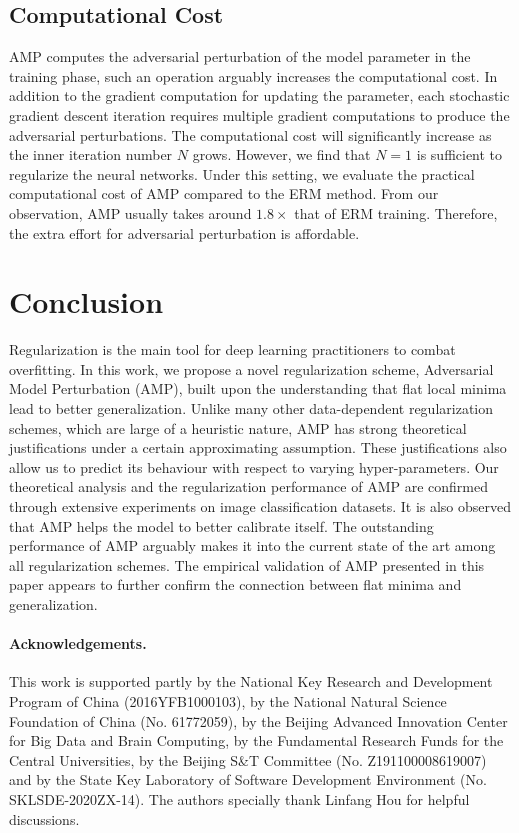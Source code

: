 \documentclass[final]{cvpr}
\begin{document}
\subsection{Computational Cost}\label{sec:cost}

AMP computes the adversarial perturbation of the model parameter in the training phase, such an operation arguably increases the computational cost. In addition to the gradient computation for updating the parameter, each stochastic gradient descent iteration requires multiple gradient computations to produce the adversarial perturbations. The computational cost will significantly increase as the inner iteration number $N$ grows. However, we find that $N=1$ is sufficient to regularize the neural networks. Under this setting, we evaluate the practical computational cost of AMP compared to the ERM method. From our observation, AMP usually takes around $1.8\times$ that of ERM training. Therefore, the extra effort for adversarial perturbation is affordable.

\section{Conclusion}

Regularization is the main tool for deep learning practitioners to combat overfitting. In this work, we propose a novel regularization scheme, Adversarial Model Perturbation (AMP), built upon the understanding that flat local minima lead to better generalization. Unlike many other data-dependent regularization schemes, which are large of a heuristic nature, AMP has strong theoretical justifications under a certain approximating assumption. These justifications also allow us to predict its behaviour with respect to varying hyper-parameters. Our theoretical analysis and the regularization performance of AMP are confirmed through extensive experiments on image classification datasets. It is also observed that AMP helps the model to better calibrate itself. The outstanding performance of AMP arguably makes it into the current state of the art among all regularization schemes. The empirical validation of AMP presented in this paper appears to further confirm the connection between flat minima and generalization.

\paragraph{Acknowledgements.}
This work is supported partly by the National Key Research and Development Program of China (2016YFB1000103), by the National Natural Science Foundation of China (No. 61772059), by the Beijing Advanced Innovation Center for Big Data and Brain Computing, by the Fundamental Research Funds for the Central Universities, by the Beijing S\&T Committee (No. Z191100008619007) and by the State Key Laboratory of Software Development Environment (No. SKLSDE-2020ZX-14). The authors specially thank Linfang Hou for helpful discussions.
\end{document}
